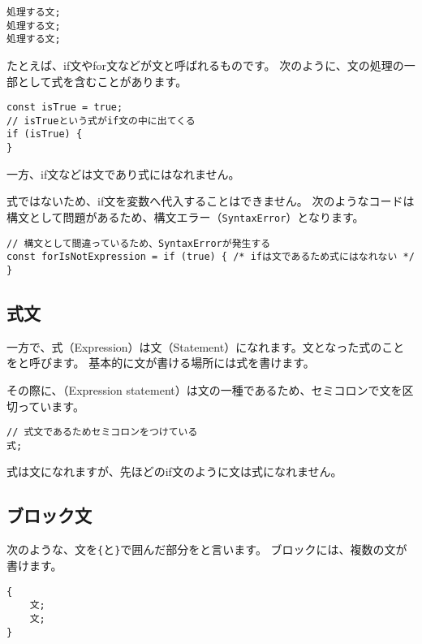 \begin{lstlisting}
処理する文;
処理する文;
処理する文;
\end{lstlisting}

たとえば、if文やfor文などが文と呼ばれるものです。
次のように、文の処理の一部として式を含むことがあります。

\begin{lstlisting}
const isTrue = true;
// isTrueという式がif文の中に出てくる
if (isTrue) {
}
\end{lstlisting}

一方、if文などは文であり式にはなれません。

式ではないため、if文を変数へ代入することはできません。
次のようなコードは構文として問題があるため、構文エラー（\texttt{SyntaxError}）となります。

\begin{lstlisting}
// 構文として間違っているため、SyntaxErrorが発生する
const forIsNotExpression = if (true) { /* ifは文であるため式にはなれない */ }
\end{lstlisting}

\hypertarget{expression-statement}{%
\subsection{式文}\label{expression-statement}}

一方で、式（Expression）は文（Statement）になれます。文となった式のことを\textbf{}と呼びます。
基本的に文が書ける場所には式を書けます。

その際に、\textbf{}（Expression
statement）は文の一種であるため、セミコロンで文を区切っています。

\begin{lstlisting}
// 式文であるためセミコロンをつけている
式;
\end{lstlisting}

式は文になれますが、先ほどのif文のように文は式になれません。

\hypertarget{block-statement}{%
\subsection{ブロック文}\label{block-statement}}

次のような、文を\texttt{\{}と\texttt{\}}で囲んだ部分を\textbf{}と言います。
ブロックには、複数の文が書けます。
\newpage
\begin{lstlisting}
{
    文;
    文;
}
\end{lstlisting}


